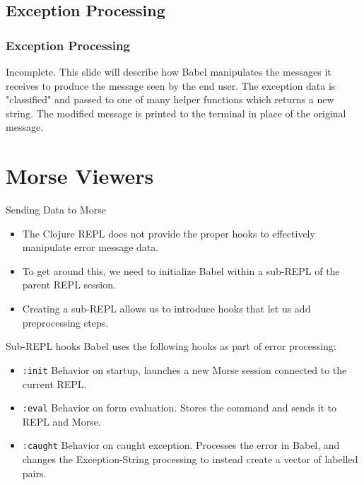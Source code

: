 \documentclass{beamer}
\begin{document}
\subsection{Exception Processing}

\begin{frame}
\frametitle{Exception Processing}
Incomplete. This slide will describe how Babel manipulates the messages it receives to produce the message seen by the end user. The exception data is "classified" and passed to one of many helper functions which returns a new string. The modified message is printed to the terminal in place of the original message.
\end{frame}

\section{Morse Viewers}
\begin{frame}{Sending Data to Morse}
  \begin{itemize}
    \item<1-> The Clojure REPL does not provide the proper hooks to effectively manipulate error message data.
    \item<2-> To get around this, we need to initialize Babel within a sub-REPL of the parent REPL session.
    \item<3-> Creating a sub-REPL allows us to introduce hooks that let us add preprocessing steps.
  \end{itemize}
\end{frame}

\begin{frame}{Sub-REPL hooks}
  Babel uses the following hooks as part of error processing:
  \begin{itemize}
    \item<1-> \texttt{:init} Behavior on startup, launches a new Morse session connected to the current REPL.
    \item<2-> \texttt{:eval} Behavior on form evaluation. Stores the command and sends it to REPL and Morse.
    \item<3-> \texttt{:caught} Behavior on caught exception. Processes the error in Babel, and changes the Exception-\>String processing to instead create a vector of labelled pairs.  
  \end{itemize}
\end{frame}
\end{document}
